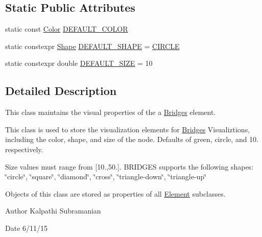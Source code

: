 \subsection*{Static Public Attributes}
\begin{DoxyCompactItemize}
\item 
static const \mbox{\hyperlink{classbridges_1_1_color}{Color}} \mbox{\hyperlink{classbridges_1_1_element_visualizer_ade224640b18e3f6eed42098ea0ad5b3a}{D\+E\+F\+A\+U\+L\+T\+\_\+\+C\+O\+L\+OR}}
\item 
static constexpr \mbox{\hyperlink{namespacebridges_a1b4050586bd708782ae0d4f3b06b9579}{Shape}} \mbox{\hyperlink{classbridges_1_1_element_visualizer_a2800a212357180e4941a818b958aabd9}{D\+E\+F\+A\+U\+L\+T\+\_\+\+S\+H\+A\+PE}} = \mbox{\hyperlink{namespacebridges_a1b4050586bd708782ae0d4f3b06b9579aa968bf0f7aeccbae1a40751345bf2e64}{C\+I\+R\+C\+LE}}
\item 
static constexpr double \mbox{\hyperlink{classbridges_1_1_element_visualizer_a81cc788d6149d5d582099cbc35e18c5a}{D\+E\+F\+A\+U\+L\+T\+\_\+\+S\+I\+ZE}} = 10
\end{DoxyCompactItemize}


\subsection{Detailed Description}
This class maintains the visual properties of the a \mbox{\hyperlink{namespacebridges_1_1_bridges}{Bridges}} element. 

This class is used to store the visualization elements for \mbox{\hyperlink{namespacebridges_1_1_bridges}{Bridges}} Visualiztions, including the color, shape, and size of the node. Defaults of green, circle, and 10. respectively.

Size values must range from \mbox{[}10.,50.\mbox{]}. B\+R\+I\+D\+G\+ES supports the following shapes\+: \char`\"{}circle\char`\"{}, \char`\"{}square\char`\"{}, \char`\"{}diamond\char`\"{}, \char`\"{}cross\char`\"{}, \char`\"{}triangle-\/down\char`\"{}, \char`\"{}triangle-\/up\char`\"{}

Objects of this class are stored as properties of all \mbox{\hyperlink{classbridges_1_1_element}{Element}} subclasses.

\begin{DoxyAuthor}{Author}
Kalpathi Subramanian 
\end{DoxyAuthor}
\begin{DoxyDate}{Date}
6/11/15 
\end{DoxyDate}


